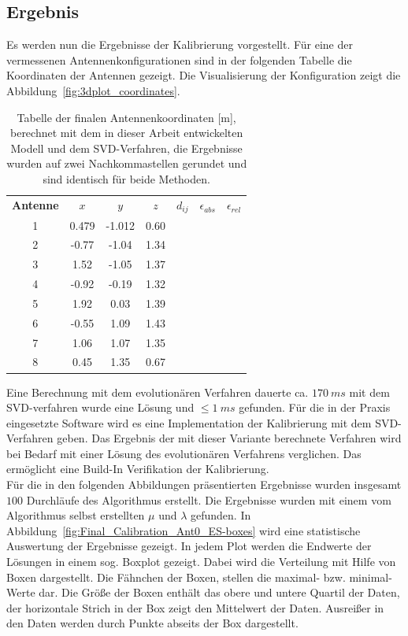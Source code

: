 \subsection{Ergebnis}
Es werden nun die Ergebnisse der Kalibrierung vorgestellt. Für eine der vermessenen Antennenkonfigurationen sind in der folgenden Tabelle die Koordinaten der Antennen gezeigt. Die Visualisierung der Konfiguration zeigt die Abbildung~\ref{fig:3dplot_coordinates}.\\
%
\begin{table} [!h]
	\begin{center}
		\begin{tabular}{ccccccc}
		      \textbf{Antenne} & \textbf{$x$} & \textbf{$y$} & \textbf{$z$} & \textbf{$d_{ij}$} & \textbf{$\epsilon_{abs}$} & \textbf{$\epsilon_{rel}$} \\
		      1 &	0.479	&	-1.012 & 0.60 &&&\\
		      2 &	-0.77 	&	-1.04 & 1.34 &&&\\
		      3 &	1.52  	&	-1.05 & 1.37 &&&\\
		      4 &	-0.92 	&	-0.19 & 1.32 &&&\\
		      5 &	1.92 	&	0.03 & 1.39 &&&\\
		      6 &	-0.55 	&	1.09 & 1.43 &&&\\
		      7 &	1.06 	&	1.07 & 1.35 &&&\\
		      8 &	0.45 	&	1.35 & 0.67 &&&\\
%		      
		\end{tabular}
		\caption[Finale Antennen Koordinaten]{Tabelle der finalen Antennenkoordinaten [m], berechnet mit dem in dieser Arbeit entwickelten Modell und dem SVD-Verfahren, die Ergebnisse wurden auf zwei Nachkommastellen gerundet und sind identisch für beide Methoden.}
		\label{tab:FinalCoords}
	\end{center}
\end{table}
%
Eine Berechnung mit dem evolutionären Verfahren dauerte ca. $170~ms$ mit dem SVD-verfahren wurde eine Lösung und $\le 1~ms$ gefunden. Für die in der Praxis eingesetzte Software wird es eine Implementation der Kalibrierung mit dem SVD-Verfahren geben. Das Ergebnis der mit dieser Variante berechnete Verfahren wird bei Bedarf mit einer Lösung des evolutionären Verfahrens verglichen. Das ermöglicht eine Build-In Verifikation der Kalibrierung.\\

Für die in den folgenden Abbildungen präsentierten Ergebnisse wurden insgesamt $100$ Durchläufe des Algorithmus erstellt. Die Ergebnisse wurden mit einem vom Algorithmus selbst erstellten $\mu$ und $\lambda$ gefunden. In Abbildung~\ref{fig:Final_Calibration_Ant0_ES-boxes} wird eine statistische Auswertung der Ergebnisse gezeigt. In jedem Plot werden die Endwerte der Lösungen in einem sog. Boxplot gezeigt. Dabei wird die Verteilung mit Hilfe von Boxen dargestellt. Die Fähnchen der Boxen, stellen die maximal- bzw. minimal-Werte dar. Die Größe der Boxen enthält das obere und untere Quartil der Daten, der horizontale Strich in der Box zeigt den Mittelwert der Daten. Ausreißer in den Daten werden durch Punkte abseits der Box dargestellt.\\
%

